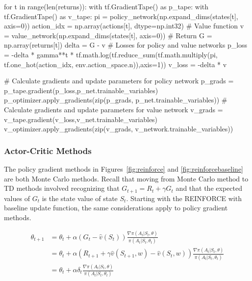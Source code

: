 \begin{pythoncode}
for t in range(len(returns)):
    with tf.GradientTape() as p_tape:
        with tf.GradientTape() as v_tape:
            pi = policy_network(np.expand_dims(states[t], axis=0))
            action_idx = np.array(actions[t], dtype=np.int32)
            # Value function
            v = value_network(np.expand_dims(states[t], axis=0))
            # Return
            G = np.array(returns[t])
            delta = G - v
            # Losses for policy and value networks
            p_loss = -delta * gamma**t *
                tf.math.log(tf.reduce_sum(tf.math.multiply(pi,
                    tf.one_hot(action_idx, env.action_space.n)),axis=1))
            v_loss = -delta * v

    # Calculate gradients and update parameters for policy network
    p_grads = p_tape.gradient(p_loss,p_net.trainable_variables)  
    p_optimizer.apply_gradients(zip(p_grads, 
        p_net.trainable_variables))
    # Calculate gradients and update parameters for value network
    v_grads = v_tape.gradient(v_loss,v_net.trainable_variables)
    v_optimizer.apply_gradients(zip(v_grads, 
        v_network.trainable_variables))
\end{pythoncode}



\subsubsection*{Actor-Critic Methods}

The policy gradient methods in Figures~\ref{fig:reinforce} and \ref{fig:reinforcebaseline} are both Monte Carlo methods. Recall that moving from Monte Carlo method to TD methods involved recognizing that $G_{t+1} = R_t + \gamma G_t$ and that the expected values of $G_t$ is the state value of state $S_t$. Starting with the REINFORCE with baseline update function, the same considerations apply to policy gradient methods.

\begin{align*}
\theta_{t+1} &= \theta_t + \alpha (G_{t} - \hat{v}(S_t)) \frac{\nabla \pi(A_t | S_t, \theta)}{\pi(A_t | S_t, \theta_t)} \\
&= \theta_t + \alpha (R_{t+1} + \gamma \hat{v}(S_{t+1}, w) - \hat{v}(S_t, w)) \frac{\nabla \pi(A_t | S_t, \theta)}{\pi(A_t | S_t, \theta_t)} \\
&= \theta_t + \alpha \delta_t \frac{\nabla \pi(A_t | S_t, \theta)}{\pi(A_t | S_t, \theta_t)}
\end{align*}

